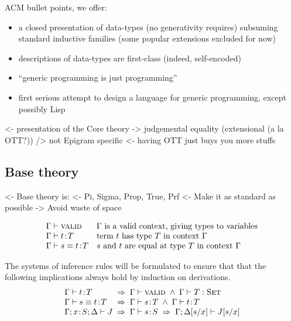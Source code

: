 \documentclass[preprint, authoryear]{sigplanconf}
\newenvironment{structure}{\footnotesize\verbatim}{\endverbatim}
\begin{document}
ACM bullet points, we offer:
\begin{itemize}
\item a closed presentation of data-types (no generativity requires)
  subsuming standard inductive families (some popular extensions
  excluded for now)
\item descriptions of data-types are first-class (indeed,
  self-encoded)
\item ``generic programming is just programming''
\item first serious attempt to design a language for generic
  programming, except possibly Lisp
\end{itemize}

\begin{structure}
<- presentation of the Core theory
    -> judgemental equality (extensional (a la OTT?))
    /> not Epigram specific 
        <- having OTT just buys you more stuffs
\end{structure}


\subsection{Base theory}

\begin{structure}
<- Base theory is:
    <- Pi, Sigma, Prop, True, Prf
<- Make it as standard as possible
    -> Avoid waste of space
\end{structure}

\[
\begin{array}{ll}
\Gamma\vdash\textsc{valid} & \mbox{\(\Gamma\) is a valid context, giving types to
                    variables} \\
\Gamma\vdash t\!:\!T & \mbox{term \(t\) has type \(T\) in context \(\Gamma\)} \\
\Gamma\vdash s \equiv t\!:\!T & \mbox{\(s\) and \(t\) are equal at type \(T\)
   in context \(\Gamma\)} \\
\end{array}
\]

The systems of inference rules will be formulated to ensure that that the
following implications always hold by induction on derivations.
\[
\begin{array}{l@{\;\;\Rightarrow\;\;}l}
\Gamma\vdash \Bhab{t}{T}            & \Gamma\vdash\Valid \;\wedge\; \Gamma\vdash\Type{T} \\
\Gamma\vdash s \equiv \Bhab{t}{T}   & \Gamma\vdash \Bhab{s}{T} \;\wedge\; \Gamma\vdash \Bhab{t}{T} \\
\Gamma;\xS;\Delta \vdash J          & \Gamma\vdash \Bhab{s}{S} \;\Rightarrow\; 
                                           \Gamma;\Delta[s/x] \vdash J[s/x] \\
\end{array}
\]
\end{document}
